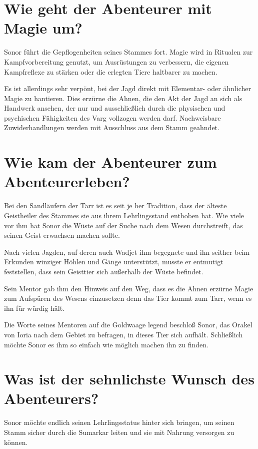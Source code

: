 \documentclass{article}
\begin{document}
	\section[Magie]{Wie geht der Abenteurer mit Magie um?}

	Sonor führt die Gepflogenheiten seines Stammes fort. Magie wird in
	Ritualen zur Kampfvorbereitung genutzt, um Ausrüstungen zu verbessern,
	die eigenen Kampfreflexe zu stärken oder die erlegten Tiere haltbarer zu
	machen.

	Es ist allerdings sehr verpönt, bei der Jagd direkt mit Elementar- oder
	ähnlicher Magie zu hantieren. Dies erzürne die Ahnen, die den Akt der Jagd an
	sich als Handwerk ansehen, der nur und ausschließlich durch die
	physischen und psychischen Fähigkeiten des Varg vollzogen werden darf.
	Nachweisbare Zuwiderhandlungen werden mit Ausschluss aus dem Stamm geahndet.


	\section[Schicksal]{Wie kam der Abenteurer zum Abenteurerleben?}

	Bei den Sandläufern der Tarr ist es seit je her Tradition, dass der
	älteste Geistheiler des Stammes sie aus ihrem Lehrlingsstand enthoben
	hat. Wie viele vor ihm hat Sonor die Wüste auf der Suche nach dem Wesen
	durchstreift, das seinen Geist erwachsen machen sollte. 

	Nach vielen Jagden, auf deren auch Wadjet ihm begegnete und ihn seither
	beim Erkunden winziger Höhlen und Gänge unterstützt, musste er entmutigt
	feststellen, dass sein Geisttier sich außerhalb der Wüste befindet.

	Sein Mentor gab ihm den Hinweis auf den Weg, dass es die Ahnen erzürne
	Magie zum Aufspüren des Wesens einzusetzen denn das Tier kommt zum Tarr,
	wenn es ihn für würdig hält.

	Die Worte seines Mentoren auf die Goldwaage legend beschloß Sonor, das
	Orakel von Ioria nach dem Gebiet zu befragen, in dieses Tier sich
	aufhält. Schließlich möchte Sonor es ihm so einfach wie möglich machen
	ihn zu finden.


	\section[Antrieb]{Was ist der sehnlichste Wunsch des Abenteurers?}

	Sonor möchte endlich seinen Lehrlingsstatus hinter sich bringen, um
	seinen Stamm sicher durch die Sumarkar leiten und sie mit Nahrung
	versorgen zu können.
\end{document}
